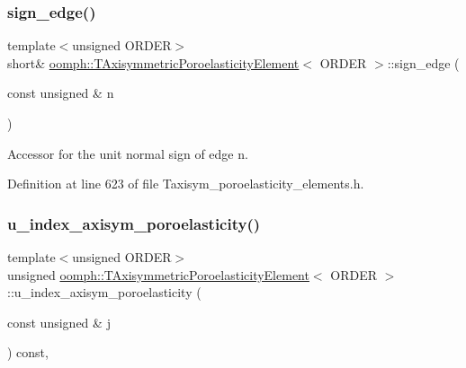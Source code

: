 \subsubsection{\texorpdfstring{sign\+\_\+edge()}{sign\_edge()}\hspace{0.1cm}{\footnotesize\ttfamily [2/2]}}
{\footnotesize\ttfamily template$<$unsigned O\+R\+D\+ER$>$ \\
short\& \hyperlink{classoomph_1_1TAxisymmetricPoroelasticityElement}{oomph\+::\+T\+Axisymmetric\+Poroelasticity\+Element}$<$ O\+R\+D\+ER $>$\+::sign\+\_\+edge (\begin{DoxyParamCaption}\item[{const unsigned \&}]{n }\end{DoxyParamCaption})\hspace{0.3cm}{\ttfamily [inline]}}



Accessor for the unit normal sign of edge n. 



Definition at line 623 of file Taxisym\+\_\+poroelasticity\+\_\+elements.\+h.

\mbox{\label{classoomph_1_1TAxisymmetricPoroelasticityElement_adcfaa53074c4710fa4c4d34ce37d326c}} 
\subsubsection{\texorpdfstring{u\+\_\+index\+\_\+axisym\+\_\+poroelasticity()}{u\_index\_axisym\_poroelasticity()}}
{\footnotesize\ttfamily template$<$unsigned O\+R\+D\+ER$>$ \\
unsigned \hyperlink{classoomph_1_1TAxisymmetricPoroelasticityElement}{oomph\+::\+T\+Axisymmetric\+Poroelasticity\+Element}$<$ O\+R\+D\+ER $>$\+::u\+\_\+index\+\_\+axisym\+\_\+poroelasticity (\begin{DoxyParamCaption}\item[{const unsigned \&}]{j }\end{DoxyParamCaption}) const\hspace{0.3cm}{\ttfamily [inline]}, {\ttfamily [virtual]}}



